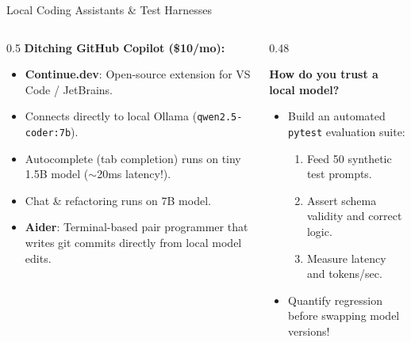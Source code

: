 \documentclass[10pt,aspectratio=169]{beamer}
\begin{document}
\begin{frame}{Local Coding Assistants \& Test Harnesses}
    \begin{columns}[T]
        \begin{column}{0.5\textwidth}
            \textbf{Ditching GitHub Copilot (\$10/mo):}
            \begin{itemize}
                \item \textbf{Continue.dev}: Open-source extension for VS Code / JetBrains.
                \item Connects directly to local Ollama (\texttt{qwen2.5-coder:7b}).
                \item Autocomplete (tab completion) runs on tiny 1.5B model ($\sim$20ms latency!).
                \item Chat \& refactoring runs on 7B model.
                \item \textbf{Aider}: Terminal-based pair programmer that writes git commits directly from local model edits.
            \end{itemize}
        \end{column}
        \begin{column}{0.48\textwidth}
            \begin{tcolorbox}[colback=ShoeTeal!10, colframe=ShoeTeal, title=\textbf{The Local Test Harness}]
                \small
                \textbf{How do you trust a local model?}
                \begin{itemize}
                    \item Build an automated \texttt{pytest} evaluation suite:
                    \begin{enumerate}
                        \item Feed 50 synthetic test prompts.
                        \item Assert schema validity and correct logic.
                        \item Measure latency and tokens/sec.
                    \end{enumerate}
                    \item Quantify regression before swapping model versions!
                \end{itemize}
            \end{tcolorbox}
        \end{column}
    \end{columns}
\end{frame}
\end{document}
